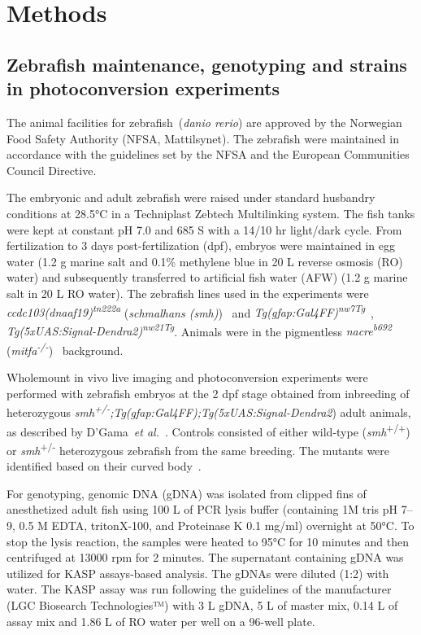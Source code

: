 \documentclass{WileyMSP-template}
\begin{document}
\section{Methods}

\subsection{Zebrafish maintenance, genotyping and strains in photoconversion experiments}
The animal facilities for zebrafish~(\emph{danio rerio}) are approved by the
Norwegian Food Safety Authority (NFSA, Mattilsynet).
The zebrafish were maintained in accordance with the guidelines set by the
NFSA and the European Communities Council Directive.

The embryonic and adult zebrafish were raised under standard husbandry
conditions at 28.5°C in a Techniplast Zebtech Multilinking system.
The fish tanks were kept at constant pH 7.0 and 685 \textmu S with a
14/10 hr light/dark cycle.
From fertilization to 3 days post-fertilization (dpf), embryos were maintained in egg
water (1.2 g marine salt and 0.1\% methylene blue in 20 L reverse osmosis (RO) water)
and subsequently transferred to artificial fish water (AFW)
(1.2 g marine salt in 20 L RO water). The zebrafish lines used in the experiments were
\emph{ccdc103(dnaaf19)\textsuperscript{tn222a}}
(\emph{schmalhans (smh)})~\cite{Jau-NianChen1997Left-rightZebrafish}
and \emph{Tg(gfap:Gal4FF)\textsuperscript{nw7Tg}}~\cite{DiazVerdugo2019Glia-neuronSeizures},
\emph{Tg(5xUAS:Signal-Dendra2)\textsuperscript{nw21Tg}}.
Animals were in the pigmentless \emph{nacre\textsuperscript{b692}}
(\emph{mitfa\textsuperscript{-/-}})~\cite{JamesA.Lister1999NacreFate} background.

Wholemount in vivo live imaging and photoconversion
experiments were performed with zebrafish embryos at the 2 dpf stage obtained from inbreeding of heterozygous
\emph{smh\textsuperscript{+/-};Tg(gfap:Gal4FF);Tg(5xUAS:Signal-Dendra2})
adult animals, as described by D'Gama~\emph{et al.}~\cite{DGama2025MotileBrain}.
Controls consisted of either wild-type (\emph{smh}\textsuperscript{+/+})
or \emph{smh}\textsuperscript{+/-} heterozygous zebrafish from the same breeding.
The mutants were identified based on their curved body~\cite{Jau-NianChen1997Left-rightZebrafish}.

For genotyping, genomic DNA (gDNA) was isolated from clipped fins of anesthetized adult
fish using 100 \textmu L of PCR lysis buffer (containing 1M tris pH 7--9, 0.5 M EDTA,
tritonX-100, and Proteinase K 0.1 mg/ml) overnight at 50°C.
To stop the lysis reaction, the samples were heated to 95°C for 10 minutes
and then centrifuged at 13000 rpm for 2 minutes.
The supernatant containing gDNA was utilized for KASP assays-based analysis.
The gDNAs were diluted (1:2) with water. 
The KASP assay was run following the guidelines of the
manufacturer (LGC Biosearch Technologies™) with 3 \textmu L gDNA,
5 \textmu L of master mix, 0.14 \textmu L of assay mix
and 1.86 \textmu L of RO water per well on a 96-well plate.
\end{document}
